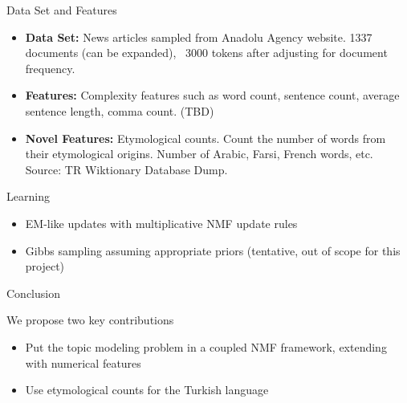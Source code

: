 \documentclass[pdf]{beamer}
\begin{document}
\begin{frame}{Data Set and Features}
	
	\begin{itemize}
		\item {\bf Data Set:} News articles sampled from Anadolu Agency website. 1337 documents (can be expanded), ~3000 tokens after adjusting for document frequency. 
		\item {\bf Features:} Complexity features such as word count, sentence count, average sentence length, comma count. (TBD)
		\item {\bf Novel Features:} Etymological counts. Count the number of words from their etymological origins. Number of Arabic, Farsi, French words, etc. Source: TR Wiktionary Database Dump.
	\end{itemize}
	
\end{frame}

\begin{frame}{Learning}
	
	\begin{itemize}
		\item EM-like updates with multiplicative NMF update rules 
		\item Gibbs sampling assuming appropriate priors (tentative, out of scope for this project)
	\end{itemize}
	
\end{frame}

\begin{frame}{Conclusion}
	
	We propose two key contributions
	\begin{itemize}
		\item Put the topic modeling problem in a coupled NMF framework, extending with numerical features
		\item Use etymological counts for the Turkish language
	\end{itemize}
	
\end{frame}

{}

\end{document}
